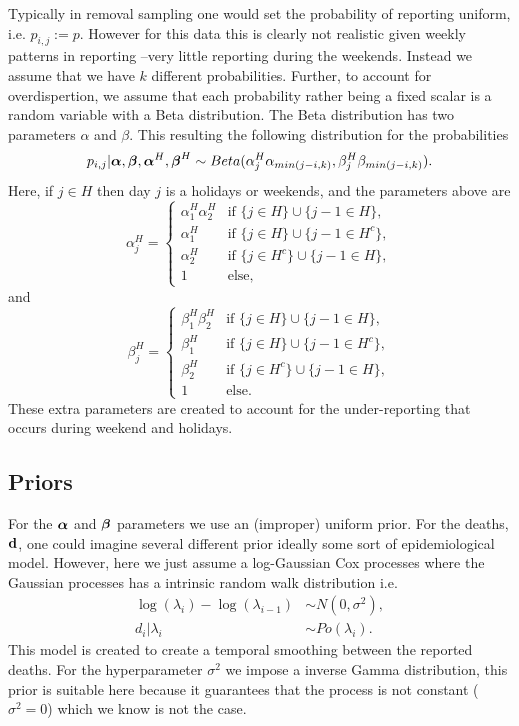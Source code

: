 Typically in removal sampling one would set the probability of reporting uniform, i.e. $p_{i,j}:=p$. However for this data this is clearly not realistic given weekly patterns in reporting --very little reporting during the weekends. Instead we assume that we have $k$ different probabilities. Further, to account for overdispertion, we assume that each probability rather being a fixed scalar is a random variable with a Beta distribution. The Beta distribution has two parameters $\alpha$ and $\beta$. This resulting the following distribution for the probabilities
$$
p_{i,j}| {\boldsymbol{\mathrm{\alpha}}},{\boldsymbol{\mathrm{\beta}}}, {\boldsymbol{\mathrm{\alpha}}}^H,{\boldsymbol{\mathrm{\beta}}}^H  \sim Beta(\alpha^H_j\alpha_{min(j-i,k)},\beta^H_j\beta_{min(j-i,k)}).
$$
Here, if $j\in H$ then day $j$ is a holidays or weekends, and the parameters above are
$$
\alpha^H_j = \begin{cases}
\alpha_1^H \alpha_2^H & \mbox{if }  \{j\in H \}\cup  \{j-1\in H \},  \\
\alpha_1^H & \mbox{if }  \{j\in H \}\cup  \{j-1\in H^c \}, \\
\alpha_2^H & \mbox{if }  \{j\in H^c \}\cup  \{j-1\in H \}, \\
1 & \mbox{else,}
\end{cases}
$$
and
$$
\beta^H_j = \begin{cases}
\beta_1^H \beta_2^H & \mbox{if }  \{j\in H \}\cup  \{j-1\in H \},  \\
\beta_1^H & \mbox{if }  \{j\in H \}\cup  \{j-1\in H^c \}, \\
\beta_2^H & \mbox{if }  \{j\in H^c \}\cup  \{j-1\in H \}, \\
1 & \mbox{else.}
\end{cases}
$$
These extra parameters are created to account for the under-reporting that occurs during weekend and holidays.


\subsection{Priors}
For the ${\boldsymbol{\mathrm{\alpha}}}$ and ${\boldsymbol{\mathrm{\beta}}}$ parameters we use an (improper) uniform prior. For the deaths, ${\boldsymbol{\mathrm{d}}}$, one could imagine several different prior ideally some sort of epidemiological model. However, here we just assume a log-Gaussian Cox processes \cite{Moller1998_log_gaussian} where the Gaussian processes has a intrinsic random walk distribution \cite{Rue2005_gaussian_markov} i.e.
\begin{align*}
\log(\lambda_i) - \log(\lambda_{i-1}) &\sim N(0,\sigma^2),\\
d_i| \lambda_i  &\sim Po(\lambda_i).
\end{align*}
This model is created to create a temporal smoothing between the reported deaths.
For the hyperparameter $\sigma^2$ we impose a inverse Gamma distribution, this prior is suitable here because it guarantees that the process is not constant ($\sigma^2=0$) which we know is not the case.
